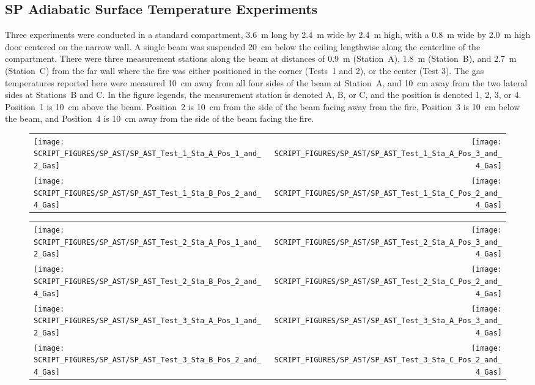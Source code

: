 \clearpage

\subsection{SP Adiabatic Surface Temperature Experiments}

Three experiments were conducted in a standard compartment, 3.6~m long by 2.4~m wide by 2.4~m high, with a 0.8~m wide by 2.0~m high door centered on the narrow wall. A single beam was suspended 20~cm below the ceiling lengthwise along the centerline of the compartment. There were three measurement stations along the beam at distances of 0.9~m (Station~A), 1.8~m (Station~B), and 2.7~m (Station~C) from the far wall where the fire was either positioned in the corner (Tests~1 and 2), or the center (Test 3). The gas temperatures reported here were measured 10~cm away from all four sides of the beam at Station~A, and 10~cm away from the two lateral sides at Stations~B and C. In the figure legends, the measurement station is denoted A, B, or C, and the position is denoted 1, 2, 3, or 4. Position~1 is 10~cm above the beam. Position~2 is 10~cm from the side of the beam facing away from the fire, Position~3 is 10~cm below the beam, and Position~4 is 10~cm away from the side of the beam facing the fire.

\begin{figure}[h!]
\begin{tabular*}{\textwidth}{l@{\extracolsep{\fill}}r}
\texttt{[image: SCRIPT\_FIGURES/SP\_AST/SP\_AST\_Test\_1\_Sta\_A\_Pos\_1\_and\_2\_Gas]} &
\texttt{[image: SCRIPT\_FIGURES/SP\_AST/SP\_AST\_Test\_1\_Sta\_A\_Pos\_3\_and\_4\_Gas]} \\
\texttt{[image: SCRIPT\_FIGURES/SP\_AST/SP\_AST\_Test\_1\_Sta\_B\_Pos\_2\_and\_4\_Gas]} &
\texttt{[image: SCRIPT\_FIGURES/SP\_AST/SP\_AST\_Test\_1\_Sta\_C\_Pos\_2\_and\_4\_Gas]}
\end{tabular*}
\label{SP_Test_1_Gas}
\end{figure}

\newpage

\begin{figure}[p]
\begin{tabular*}{\textwidth}{l@{\extracolsep{\fill}}r}
\texttt{[image: SCRIPT\_FIGURES/SP\_AST/SP\_AST\_Test\_2\_Sta\_A\_Pos\_1\_and\_2\_Gas]} &
\texttt{[image: SCRIPT\_FIGURES/SP\_AST/SP\_AST\_Test\_2\_Sta\_A\_Pos\_3\_and\_4\_Gas]} \\
\texttt{[image: SCRIPT\_FIGURES/SP\_AST/SP\_AST\_Test\_2\_Sta\_B\_Pos\_2\_and\_4\_Gas]} &
\texttt{[image: SCRIPT\_FIGURES/SP\_AST/SP\_AST\_Test\_2\_Sta\_C\_Pos\_2\_and\_4\_Gas]} \\
\texttt{[image: SCRIPT\_FIGURES/SP\_AST/SP\_AST\_Test\_3\_Sta\_A\_Pos\_1\_and\_2\_Gas]} &
\texttt{[image: SCRIPT\_FIGURES/SP\_AST/SP\_AST\_Test\_3\_Sta\_A\_Pos\_3\_and\_4\_Gas]} \\
\texttt{[image: SCRIPT\_FIGURES/SP\_AST/SP\_AST\_Test\_3\_Sta\_B\_Pos\_2\_and\_4\_Gas]} &
\texttt{[image: SCRIPT\_FIGURES/SP\_AST/SP\_AST\_Test\_3\_Sta\_C\_Pos\_2\_and\_4\_Gas]}
\end{tabular*}
\label{SP_Test_2_3_Gas}
\end{figure}


